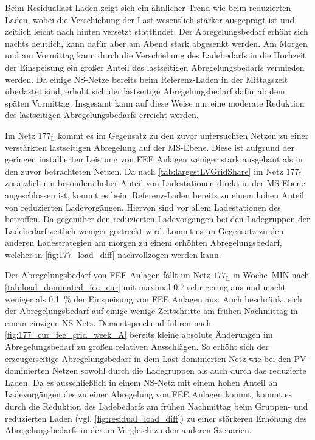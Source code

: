 

Beim Residuallast-Laden zeigt sich ein ähnlicher Trend wie beim reduzierten Laden, wobei die Verschiebung der Last wesentlich stärker ausgeprägt ist und zeitlich leicht nach hinten versetzt stattfindet.
Der Abregelungsbedarf erhöht sich nachts deutlich, kann dafür aber am Abend stark abgesenkt werden.
Am Morgen und am Vormittag kann durch die Verschiebung des Ladebedarfs in die Hochzeit der Einspeisung ein großer Anteil des lastseitigen Abregelungsbedarfs vermieden werden.
Da einige \gls{NS}-Netze bereits beim Referenz-Laden in der Mittagszeit überlastet sind, erhöht sich der lastseitige Abregelungsbedarf dafür ab dem späten Vormittag.
Insgesamt kann auf diese Weise nur eine moderate Reduktion des lastseitigen Abregelungsbedarfs erreicht werden.\medskip

Im Netz \(177_{\text{L}}\) kommt es im Gegensatz zu den zuvor untersuchten Netzen zu einer verstärkten lastseitigen Abregelung auf der \gls{MS}-Ebene.
Diese ist aufgrund der geringen installierten Leistung von \gls{FEE} Anlagen weniger stark ausgebaut als in den zuvor betrachteten Netzen.
Da nach \autoref{tab:largestLVGridShare} im Netz \(177_{\text{L}}\) zusätzlich ein besonders hoher Anteil von Ladestationen direkt in der \gls{MS}-Ebene angeschlossen ist, kommt es beim Referenz-Laden bereits zu einem hohen Anteil von reduzierten Ladevorgängen.
Hiervon sind vor allem Ladestationen des \UC \Firmeparkplatz betroffen.
Da gegenüber den reduzierten Ladevorgängen bei den Ladegruppen der Ladebedarf zeitlich weniger gestreckt wird, kommt es im Gegensatz zu den anderen Ladestrategien am morgen zu einem erhöhten Abregelungsbedarf, welcher in \autoref{fig:177_load_diff} nachvollzogen werden kann.



Der Abregelungsbedarf von \gls{FEE} Anlagen fällt im Netz \(177_{\text{L}}\) in Woche~MIN nach \autoref{tab:load_dominated_fee_cur} mit maximal \SI{0.7}{\mwh} sehr gering aus und macht weniger als \SI{0.1}{\percent} der Einspeisung von \gls{FEE} Anlagen aus.
Auch beschränkt sich der Abregelungsbedarf auf einige wenige Zeitschritte am frühen Nachmittag in einem einzigen \gls{NS}-Netz.
Dementsprechend führen nach \autoref{fig:177_cur_fee_grid_week_A} bereits kleine absolute Änderungen im Abregelungsbedarf zu großen relativen Ausschlägen.
So erhöht sich der erzeugerseitige Abregelungsbedarf in dem Last-dominierten Netz wie bei den \gls{PV}-dominierten Netzen sowohl durch die Ladegruppen als auch durch das reduzierte Laden.
Da es ausschließlich in einem \gls{NS}-Netz mit einem hohen Anteil an Ladevorgängen des \UC \zH zu einer Abregelung von \gls{FEE} Anlagen kommt, kommt es durch die Reduktion des Ladebedarfs am frühen Nachmittag beim Gruppen- und reduzierten Laden (vgl. \autoref{fig:residual_load_diff}) zu einer stärkeren Erhöhung des Abregelungsbedarfs in der \SzeFirmenparkplatz im Vergleich zu den anderen Szenarien.

